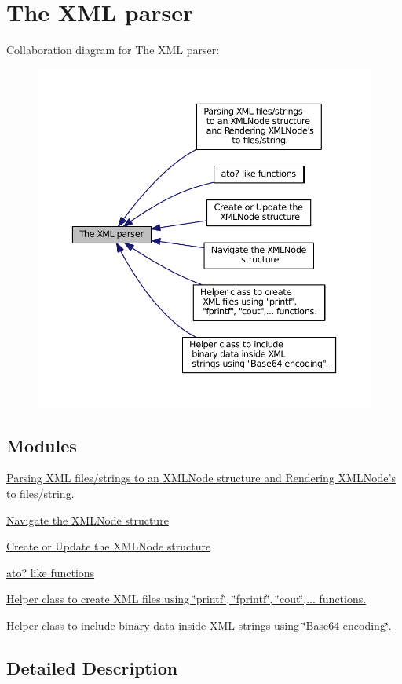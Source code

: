 \hypertarget{group__XMLParserGeneral}{\section{The X\-M\-L parser}
\label{group__XMLParserGeneral}
}
Collaboration diagram for The X\-M\-L parser\-:
\nopagebreak
\begin{figure}[H]
\begin{center}
\leavevmode
\includegraphics[width=350pt]{group__XMLParserGeneral}
\end{center}
\end{figure}
\subsection*{Modules}
\begin{DoxyCompactItemize}
\item 
\hyperlink{group__conversions}{Parsing X\-M\-L files/strings to an X\-M\-L\-Node structure and Rendering X\-M\-L\-Node's to files/string.}
\item 
\hyperlink{group__navigate}{Navigate the X\-M\-L\-Node structure}
\item 
\hyperlink{group__xmlModify}{Create or Update the X\-M\-L\-Node structure}
\item 
\hyperlink{group__atoX}{ato? like functions}
\item 
\hyperlink{group__ToXMLStringTool}{Helper class to create X\-M\-L files using \char`\"{}printf\char`\"{}, \char`\"{}fprintf\char`\"{}, \char`\"{}cout\char`\"{},... functions.}
\item 
\hyperlink{group__XMLParserBase64Tool}{Helper class to include binary data inside X\-M\-L strings using \char`\"{}\-Base64 encoding\char`\"{}.}
\end{DoxyCompactItemize}


\subsection{Detailed Description}
